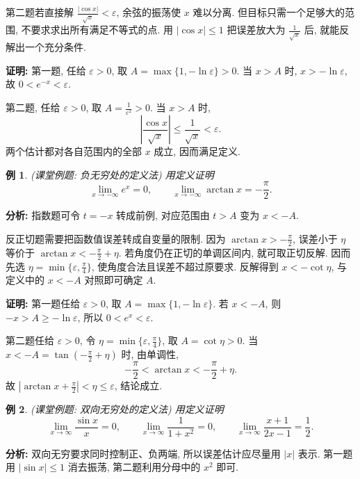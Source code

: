 \documentclass[UTF8,openany]{ctexbook}
\theoremstyle{chinesetextbook}
\newtheorem{example}{例}[section]
\newenvironment{cnproof}{\par\indent\textbf{证明:} \ignorespaces}{\par}
\begin{document}
第二题若直接解 $\displaystyle\frac{|\cos x|}{\sqrt x}<\varepsilon$, 余弦的振荡使 $x$ 难以分离. 但目标只需一个足够大的范围, 不要求求出所有满足不等式的点. 用 $|\cos x|\le1$ 把误差放大为 $\displaystyle\frac1{\sqrt x}$ 后, 就能反解出一个充分条件.
\begin{cnproof}
第一题, 任给 $\varepsilon>0$, 取 $A=\max\{1,-\ln\varepsilon\}>0$. 当 $x>A$ 时, $x>-\ln\varepsilon$, 故 $0<e^{-x}<\varepsilon$.

第二题, 任给 $\varepsilon>0$, 取 $\displaystyle A=\frac1{\varepsilon^2}>0$. 当 $x>A$ 时,
\[
\left|\frac{\cos x}{\sqrt x}\right|\le\frac1{\sqrt x}<\varepsilon.
\]
两个估计都对各自范围内的全部 $x$ 成立, 因而满足定义.
\end{cnproof}
\begin{example}
(课堂例题: 负无穷处的定义法) 用定义证明
\[
\lim_{x\to-\infty}e^x=0,\qquad
\lim_{x\to-\infty}\arctan x=-\frac\pi2.
\]
\end{example}
\par\indent\textbf{分析:} 指数题可令 $t=-x$ 转成前例, 对应范围由 $t>A$ 变为 $x<-A$.

反正切题需要把函数值误差转成自变量的限制. 因为 $\displaystyle\arctan x>-\frac\pi2$, 误差小于 $\eta$ 等价于 $\displaystyle\arctan x<-\frac\pi2+\eta$. 若角度仍在正切的单调区间内, 就可取正切反解. 因而先选 $\displaystyle\eta=\min\{\varepsilon,\frac\pi4\}$, 使角度合法且误差不超过原要求. 反解得到 $x<-\cot\eta$, 与定义中的 $x<-A$ 对照即可确定 $A$.
\begin{cnproof}
第一题任给 $\varepsilon>0$, 取 $A=\max\{1,-\ln\varepsilon\}$. 若 $x<-A$, 则 $-x>A\ge-\ln\varepsilon$, 所以 $0<e^x<\varepsilon$.

第二题任给 $\varepsilon>0$, 令 $\displaystyle\eta=\min\{\varepsilon,\frac\pi4\}$, 取 $A=\cot\eta>0$. 当 $\displaystyle x<-A=\tan(-\frac\pi2+\eta)$ 时, 由单调性,
\[
-\frac\pi2<\arctan x<-\frac\pi2+\eta.
\]
故 $\displaystyle\left|\arctan x+\frac\pi2\right|<\eta\le\varepsilon$, 结论成立.
\end{cnproof}
\begin{example}
(课堂例题: 双向无穷处的定义法) 用定义证明
\[
\lim_{x\to\infty}\frac{\sin x}{x}=0,\qquad
\lim_{x\to\infty}\frac1{1+x^2}=0,\qquad
\lim_{x\to\infty}\frac{x+1}{2x-1}=\frac12.
\]
\end{example}
\par\indent\textbf{分析:} 双向无穷要求同时控制正、负两端, 所以误差估计应尽量用 $|x|$ 表示. 第一题用 $|\sin x|\le1$ 消去振荡, 第二题利用分母中的 $x^2$ 即可.
\end{document}

